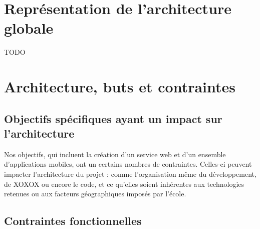 \documentclass{life-fr}
\begin{document}

\chapter{Représentation de l’architecture globale}

TODO


\chapter{Architecture, buts et contraintes}
\section{Objectifs spécifiques ayant un impact sur l’architecture}

Nos objectifs, qui incluent la création d'un service web et d'un ensemble d'applications mobiles, ont un certains nombres de contraintes. Celles-ci peuvent impacter l'architecture du projet : comme l'organisation même du développement, de XOXOX ou encore le code, et ce qu'elles soient inhérentes aux technologies retenues ou aux facteurs géographiques imposés par l'école.

\section{Contraintes fonctionnelles}
\end{document}
